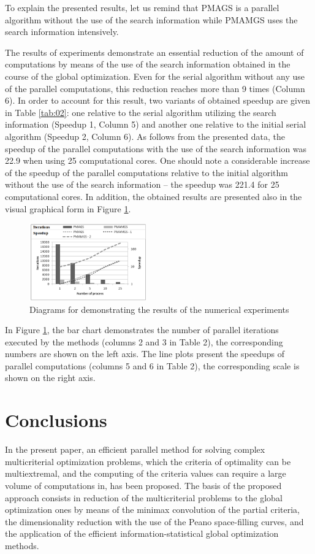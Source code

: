 \documentclass[procedia]{easychair}
\begin{document}
To explain the presented results, let us remind that PMAGS is a parallel algorithm without the use of the search information while PMAMGS uses the search information intensively. \par

The results of experiments demonstrate an essential reduction of the amount of computations by means of the use of the search information obtained in the course of the global optimization. Even for the serial algorithm without any use of the parallel computations, this reduction reaches more than 9 times (Column 6). In order to account for this result, two variants of obtained speedup are given in Table \ref{tab:02}: one relative to the serial algorithm utilizing the search information (Speedup 1, Column 5) and another one relative to the initial serial algorithm (Speedup 2, Column 6). As follows from the presented data, the speedup of the parallel computations with the use of the search information was 22.9 when using 25 computational cores. One should note a considerable increase of the speedup of the parallel computations relative to the initial algorithm without the use of the search information -- the speedup was 221.4 for 25 computational cores. In addition, the obtained results are presented also in the visual graphical form in Figure \ref{fig:res_exp}.

\begin{figure}
	\centering
	\includegraphics[width=0.45\textwidth]{res_exp}
	\caption{Diagrams for demonstrating the results of the numerical experiments}
	\label{fig:res_exp}
\end{figure}

In Figure \ref{fig:res_exp}, the bar chart demonstrates the number of parallel iterations executed by the methods (columns 2 and 3 in Table 2), the corresponding numbers are shown on the left axis. The line plots present the speedups of parallel computations (columns 5 and 6 in Table 2), the corresponding scale is shown on the right axis.

\section{Conclusions}
\label{sect:6}
In the present paper, an efficient parallel method for solving complex multicriterial optimization problems, which the criteria of optimality can be multiextremal, and the computing of the criteria values can require a large volume of computations in, has been proposed. The basis of the proposed approach consists in reduction of the multicriterial problems to the global optimization ones by means of the minimax convolution of the partial criteria, the dimensionality reduction with the use of the Peano space-filling curves, and the application of the efficient information-statistical global optimization methods. \par
\end{document}
